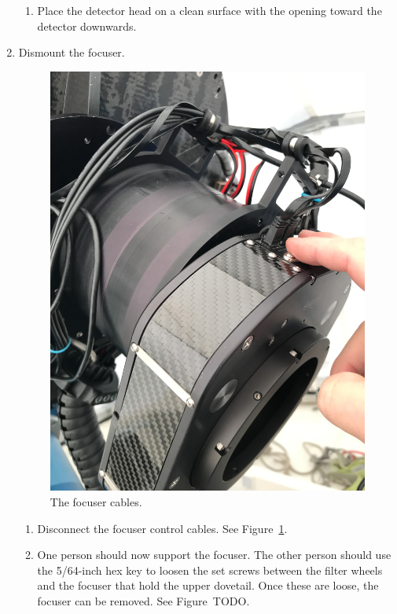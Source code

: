\begin{enumerate}
\begin{enumerate}
  \item Place the detector head on a clean surface with the opening toward the detector downwards.
  
\end{enumerate}

\item Dismount the focuser.

\begin{figure}
\begin{center}
\includegraphics[angle=0,width=0.8\linewidth]{figures/huitzi-f20-focuser-cables}
\end{center}
\caption{The focuser cables.}
\label{figure:huitzi-f20-focuser-cables}
\end{figure}

\begin{enumerate}
  
  \item Disconnect the focuser control cables. See Figure~\ref{figure:huitzi-f20-focuser-cables}.

  \item One person should now support the focuser. The other person should use the 5/64-inch hex key to loosen the set screws between the filter wheels and the focuser that hold the upper dovetail. Once these are loose, the focuser can be removed. See Figure~TODO.
  

\end{enumerate}
\end{enumerate}
